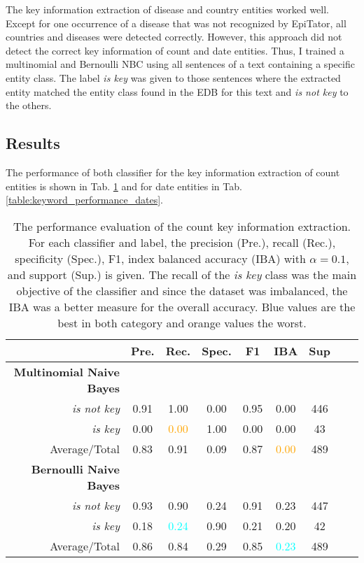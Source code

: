   The key information extraction of disease and country entities worked well.
  Except for one occurrence of a disease that was not recognized by EpiTator, all countries and diseases were detected correctly.
  However, this approach did not detect the correct key information of count and date entities.
  Thus, I trained a multinomial and Bernoulli NBC  using all sentences of a text containing a specific entity class.
  The label \textsl{is key} was given to those sentences where the extracted entity matched the entity class found in the EDB for this text and \textsl{is not key} to the others.

\subsection{Results}\label{result keywords}
  The performance of both classifier for the key information extraction of count entities is shown in Tab. \ref{table:keyword_performance_counts} and for date entities in Tab. \ref{table:keyword_performance_dates}.
  \begin{table}[h!]
    \caption{The performance evaluation of the count key information extraction. For each classifier and label, the precision (Pre.), recall (Rec.), specificity (Spec.), F1, index balanced accuracy (IBA) with $\alpha = 0.1$, and support (Sup.) is given. The recall of the \textsl{is key} class was the main objective of the classifier and since the dataset was imbalanced, the IBA was a better measure for the overall accuracy. Blue values are the best in both category and orange values the worst.}
    \centering
    \begin{tabular}{@{}rcccccccc@{}}
      \toprule
       & \textbf{Pre.} & \textbf{Rec.} & \textbf{Spec.}
      & \textbf{F1} &  \textbf{IBA}& \textbf{Sup} \\
      \midrule
      \textbf{Multinomial Naive Bayes}\\
      \textsl{is not key}& 0.91& 1.00&  0.00& 0.95& 0.00& 446 \\
      \textsl{is key}& 0.00& \textcolor{orange}{0.00}&  1.00& 0.00& 0.00& 43 \\
      Average/Total& 0.83& 0.91& 0.09& 0.87& \textcolor{orange}{0.00}& 489 \vspace{2mm}\\
      \textbf{Bernoulli Naive Bayes}\\
      \textsl{is not key}& 0.93& 0.90&  0.24& 0.91& 0.23& 447 \\
      \textsl{is key}& 0.18& \textcolor{cyan}{0.24}&  0.90& 0.21& 0.20& 42 \\
      Average/Total& 0.86& 0.84& 0.29& 0.85& \textcolor{cyan}{0.23}& 489 \vspace{2mm}\\
      \bottomrule
    \end{tabular}
  \label{table:keyword_performance_counts}
  \end{table}


